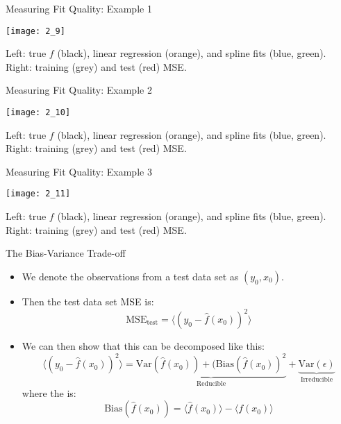 \documentclass[mathserif, aspectratio=169]{beamer}
\begin{document}
\begin{frame}{Measuring Fit Quality: Example 1}
	\vspace{-5mm}
	\begin{center}
		\texttt{[image: 2\_9]}

		Left: true $f$ (black), linear regression (orange), and spline fits (blue, green).\\
		Right: training (grey) and test (red) MSE.
	\end{center}
\end{frame}

\begin{frame}{Measuring Fit Quality: Example 2}
	\vspace{-5mm}
	\begin{center}
		\texttt{[image: 2\_10]}

		Left: true $f$ (black), linear regression (orange), and spline fits (blue, green).\\
		Right: training (grey) and test (red) MSE.
	\end{center}
\end{frame}

\begin{frame}{Measuring Fit Quality: Example 3}
	\vspace{-5mm}
	\begin{center}
		\texttt{[image: 2\_11]}

		Left: true $f$ (black), linear regression (orange), and spline fits (blue, green).\\
		Right: training (grey) and test (red) MSE.
	\end{center}
\end{frame}

\begin{frame}{The Bias-Variance Trade-off}
	\begin{itemize}
		\item We denote the observations from a test data set as $(y_0, x_0)$.
		\item Then the test data set MSE is:
			\[ \text{MSE}_\text{test} = \langle (y_0 - \hat{f}(x_0))^2 \rangle \]
		\item We can then show that this can be decomposed like this:
			\[ 
			\langle (y_0 - \hat{f}(x_0))^2 \rangle
			= \underbrace{\text{Var}(\hat{f}(x_0)) + (\text{Bias}(\hat{f}(x_0))^2}_\text{Reducible} 
			+ \underbrace{\text{Var}(\epsilon)}_\text{Irreducible}
			\]
			where the  is:
			\[ \text{Bias}(\hat{f}(x_0)) = \langle\hat{f}(x_0)\rangle - \langle f(x_0)\rangle\] 
	\end{itemize}
\end{frame}
\end{document}

